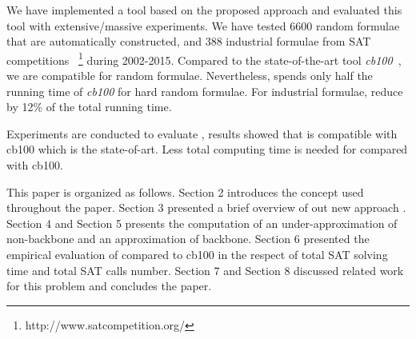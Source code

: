We have implemented a tool based on the proposed approach and evaluated this tool with extensive/massive experiments. We have tested 6600 random formulae that are automatically constructed, and 388 industrial formulae from SAT competitions ~\footnote{http://www.satcompetition.org/} during 2002-2015. Compared to the state-of-the-art tool \textit{cb100}~\cite{JLM15}, we are compatible for random formulae. Nevertheless, \tool spends only half the running time of \textit{cb100} for hard random formulae. For industrial formulae, \tool reduce by 12\% of the total running time. 

Experiments are conducted to evaluate \tool, results showed that \tool is compatible with cb100 which is the state-of-art. Less total computing time is needed for \tool compared with cb100.


This paper is organized as follows.
Section 2 introduces the concept used throughout the paper.
Section 3 presented a brief overview of out new approach \tool.
Section 4 and Section 5 presents the computation of an under-approximation of non-backbone and an approximation of backbone.
Section 6 presented the empirical evaluation of \tool compared to cb100 in the respect of total SAT solving time and total SAT calls number.
Section 7 and Section 8 discussed related work for this problem and concludes the paper.
